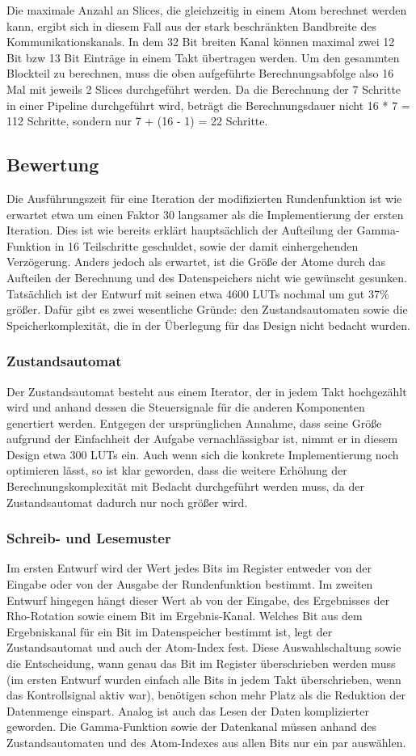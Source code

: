 Die maximale Anzahl an Slices, die gleichzeitig in einem Atom berechnet werden kann, ergibt sich in diesem Fall aus der stark beschränkten Bandbreite
des Kommunikationskanals. In dem 32 Bit breiten Kanal können maximal zwei 12 Bit bzw 13 Bit Einträge in einem Takt übertragen werden.
Um den gesammten Blockteil zu berechnen, muss die oben aufgeführte Berechnungsabfolge also 16 Mal mit jeweils 2 Slices durchgeführt werden.
Da die Berechnung der 7 Schritte in einer Pipeline durchgeführt wird, beträgt die Berechnungsdauer nicht 16 * 7 = 112 Schritte,
sondern nur 7 + (16 - 1) = 22 Schritte.

\subsection{Bewertung}
Die Ausführungszeit für eine Iteration der modifizierten Rundenfunktion ist wie erwartet etwa um einen Faktor 30 langsamer als die Implementierung der ersten Iteration.
Dies ist wie bereits erklärt hauptsächlich der Aufteilung der Gamma-Funktion in 16 Teilschritte geschuldet, sowie der damit einhergehenden Verzögerung.
Anders jedoch als erwartet, ist die Größe der Atome durch das Aufteilen der Berechnung und des Datenspeichers nicht wie gewünscht gesunken.
Tatsächlich ist der Entwurf mit seinen etwa 4600 LUTs nochmal um gut 37\% größer. Dafür gibt es zwei wesentliche Gründe: den Zustandsautomaten sowie die Speicherkomplexität,
die in der Überlegung für das Design nicht bedacht wurden.
\subsubsection{Zustandsautomat}
Der Zustandsautomat besteht aus einem Iterator, der in jedem Takt hochgezählt wird und anhand dessen die Steuersignale für die anderen Komponenten genertiert werden.
Entgegen der ursprünglichen Annahme, dass seine Größe aufgrund der Einfachheit der Aufgabe vernachlässigbar ist, nimmt er in diesem Design etwa 300 LUTs ein.
Auch wenn sich die konkrete Implementierung noch optimieren lässt, so ist klar geworden, dass die weitere Erhöhung der Berechnungskomplexität mit Bedacht durchgeführt werden muss,
da der Zustandsautomat dadurch nur noch größer wird.
\subsubsection{Schreib- und Lesemuster}
Im ersten Entwurf wird der Wert jedes Bits im Register entweder von der Eingabe oder von der Ausgabe der Rundenfunktion bestimmt.
Im zweiten Entwurf hingegen hängt dieser Wert ab von der Eingabe, des Ergebnisses der Rho-Rotation sowie einem Bit im Ergebnis-Kanal.
Welches Bit aus dem Ergebniskanal für ein Bit im Datenspeicher bestimmt ist, legt der Zustandsautomat und auch der Atom-Index fest.
Diese Auswahlschaltung sowie die Entscheidung, wann genau das Bit im Register überschrieben werden muss (im ersten Entwurf wurden einfach alle Bits in jedem Takt überschrieben, wenn das Kontrollsignal aktiv war),
benötigen schon mehr Platz als die Reduktion der Datenmenge einspart.
Analog ist auch das Lesen der Daten komplizierter geworden. Die Gamma-Funktion sowie der Datenkanal müssen anhand des Zustandsautomaten und des Atom-Indexes aus allen Bits nur ein par auswählen.
